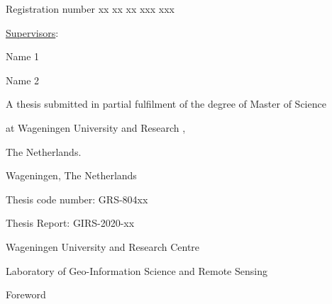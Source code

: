 \documentclass[a4paper,12pt]{book} %
\begin{document}
\begin{titlingpage}
\begin{center}
    {Registration number xx xx xx xxx xxx}\vspace{3.5cm}

    {\large \underline{Supervisors}:}\vspace{1.1cm}

    {Name 1}

    {Name 2}\vspace{3.0cm}

    {A thesis submitted in partial fulfilment of the degree of Master of Science}

    {at Wageningen University and Research ,}

    {The Netherlands.}\vspace{2.7cm}
  \end{center}

  \begin{flushright}
    {\thedate}

    {Wageningen, The Netherlands}
  \end{flushright}\vspace{0.5cm}

  Thesis code number: GRS-804xx

  Thesis Report: GIRS-2020-xx

    {Wageningen University and Research Centre}

    {Laboratory of Geo-Information Science and Remote Sensing}
\end{titlingpage}

Foreword\\
\end{document}
